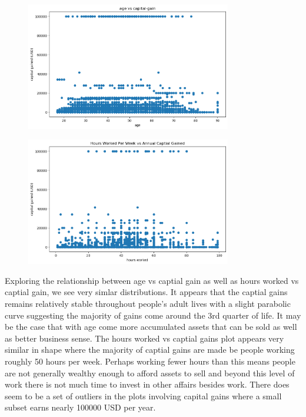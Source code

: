 \documentclass{article}
\begin{document}
    \begin{center}
        \begin{minipage}[t]{0.9\textwidth}
            \begin{figure}[H]
                \centering
                \includegraphics[width=0.8\textwidth, height=0.3\textheight]{./1_5b.png}
            \end{figure}
            \begin{figure}[H]
                \centering
                \includegraphics[width=0.8\textwidth, height=0.3\textheight]{./1_5c.png}
            \end{figure}
            Exploring the relationship between age vs captial gain as well as hours worked
            vs captial gain, we see very simlar distributions.
            It appears that the captial gains remains relatively stable throughout people's
            adult lives with a slight parabolic curve suggesting the majority of gains come
            around the 3rd quarter of life. It may be the case that with age come more
            accumulated assets that can be sold as well as better business sense.
            The hours worked vs captial gains plot appears very similar in shape where the
            majority of captial gains are made be people working roughly 50 hours per week.
            Perhaps working fewer hours than this means people are not generally wealthy enough
            to afford assets to sell and beyond this level of work there is not much
            time to invest in other affairs besides work.
            There does seem to be a set of outliers in the plots involving capital gains where
            a small subset earns nearly 100000 USD per year.
        \end{minipage}
    \end{center}
\end{document}
